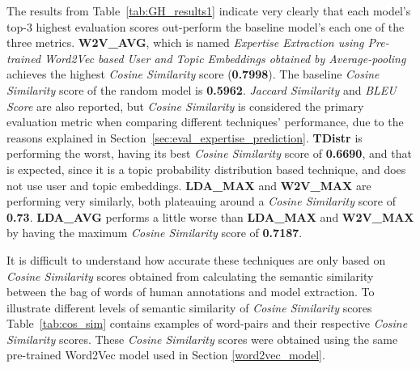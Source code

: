             The results from Table~\ref{tab:GH_results1} indicate very clearly that each model's top-$3$ highest evaluation scores out-perform the baseline model's each one of the three metrics. \textbf{W2V\_AVG}, which is named \emph{Expertise Extraction using Pre-trained Word2Vec based User and Topic Embeddings obtained by Average-pooling} achieves the highest \emph{Cosine Similarity} score (\textbf{0.7998}). The baseline \emph{Cosine Similarity} score of the random model is \textbf{0.5962}. \emph{Jaccard Similarity} and \emph{BLEU Score} are also reported, but \emph{Cosine Similarity} is considered the primary evaluation metric when comparing different techniques' performance, due to the reasons explained in Section~\ref{sec:eval_expertise_prediction}. \textbf{TDistr} is performing the worst, having its best \emph{Cosine Similarity} score of \textbf{0.6690}, and that is expected, since it is a topic probability distribution based technique, and does not use user and topic embeddings. \textbf{LDA\_MAX} and \textbf{W2V\_MAX} are performing very similarly, both plateauing around a \emph{Cosine Similarity} score of \textbf{0.73}. \textbf{LDA\_AVG} performs a little worse than  \textbf{LDA\_MAX} and \textbf{W2V\_MAX} by having the maximum \emph{Cosine Similarity} score of \textbf{0.7187}. 
            
            It is difficult to understand how accurate these techniques are only based on \emph{Cosine Similarity} scores obtained from calculating the semantic similarity between the bag of words of human annotations and model extraction. To illustrate different levels of semantic similarity of \emph{Cosine Similarity} scores Table~\ref{tab:cos_sim} contains examples of word-pairs and their respective \emph{Cosine Similarity} scores. These \emph{Cosine Similarity} scores were obtained using the same pre-trained Word2Vec model\cite{efstathiou2018word} used in Section \ref{word2vec_model}. 
            
